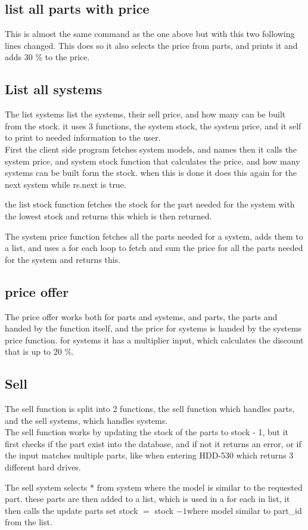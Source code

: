 \documentclass[a4paper,10pt,titlepage]{report}
\begin{document}
\subsection{list all parts with price}
This is almost the same command as the one above but with this two following lines changed.
This does so it also selects the price from parts, and prints it and adds 30 \% to the price.	

\subsection{List all systems}
The list systems list the systems, their sell price, and how many can be built from the stock. it uses 3 functions, the system stock, the system price, and it self to print to needed information to the user.
\\ \vspace{5 mm}
First the client side program fetches system models, and names then it calls the system price, and system stock function that calculates the price, and how many systems can be built form the stock. when this is done it does this again for the next system while rs.next is true.

the list stock function fetches the stock for the part needed for the system with the lowest stock and returns this which is then returned.



The system price function fetches all the parts needed for a system, adds them to a list, and uses a for each loop to fetch and sum the price for all the parts needed for the system and returns this.

\subsection{price offer}
The price offer works both for parts and systems, and parts, the parts and handed by the function itself, and the price for systems is handed by the systems price function. for systems it has a multiplier input, which calculates the discount that is up to 20 \%.

\subsection{Sell}
The sell function is split into 2 functions, the sell function which handles parts, and the sell systems, which handles systems.
\\ \vspace{5 mm}
The sell function works by updating the stock of the parts to stock - 1, but it first checks if the part exist into the database, and if not it returns an error, or if the input matches multiple parts, like when entering HDD-530 which returns 3 different hard drives. 

\vspace{5 mm}
The sell system selects * from system where the model is similar to the requested part.
these parts are then added to a list, which is used in a for each in list, it then calls the update parts set stock $=$ stock $-1 $where model similar to part\_id from the list. 

\end{document}
